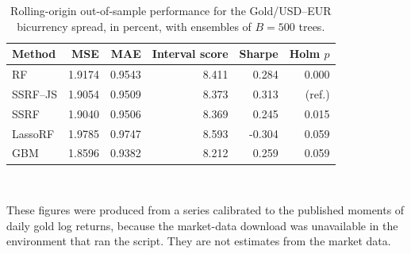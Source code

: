 \begin{table}[htbp]
\centering
\caption{Rolling-origin out-of-sample performance for the Gold/USD--EUR bicurrency spread, in percent, with ensembles of $B=500$ trees.}
\label{tab:bic_B500}
\small
\setlength{\tabcolsep}{5pt}
\begin{tabular}{lrrrrr}
\toprule
Method & MSE & MAE & Interval score & Sharpe & Holm $p$ \\
\midrule
RF & 1.9174 & 0.9543 & 8.411 & 0.284 & 0.000 \\
SSRF--JS & 1.9054 & 0.9509 & 8.373 & 0.313 & (ref.) \\
SSRF & 1.9040 & 0.9506 & 8.369 & 0.245 & 0.015 \\
LassoRF & 1.9785 & 0.9747 & 8.593 & -0.304 & 0.059 \\
GBM & 1.8596 & 0.9382 & 8.212 & 0.259 & 0.059 \\
\bottomrule
\end{tabular}
\\[2pt]
\parbox{\textwidth}{\footnotesize These figures were produced from a series calibrated to the published moments of daily gold log returns, because the market-data download was unavailable in the environment that ran the script. They are not estimates from the market data.}
\end{table}

